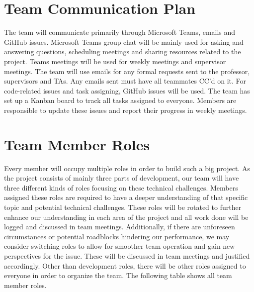 \documentclass{article}
\begin{document}
\section{Team Communication Plan}
\quad The team will communicate primarily through Microsoft Teams,  emails and GitHub issues. Microsoft Teams group chat will be mainly used for asking and answering questions, scheduling meetings and sharing resources related to the project. Teams meetings will be used for weekly meetings and supervisor meetings. 
\quad The team will use emails for any formal requests sent to the professor, supervisors and TAs. Any emails sent must have all teammates CC'd on it.
\quad For code-related issues and task assigning, GitHub issues will be used. The team has set up a Kanban board to track all tasks assigned to everyone. Members are responsible to update these issues and report their progress in weekly meetings.

\section{Team Member Roles}
\quad Every member will occupy multiple roles in order to build such a big project. As the project consists of mainly three parts of development, our team will have three different kinds of roles focusing on these technical challenges. Members assigned these roles are required to have a deeper understanding of that specific topic and potential technical challenges. These roles will be rotated to further enhance our understanding in each area of the project and all work done will be logged and discussed in team meetings. Additionally, if there are unforeseen circumstances or potential roadblocks hindering our performance, we may consider switching roles to allow for smoother team operation and gain new perspectives for the issue. These will be discussed in team meetings and justified accordingly. Other than development roles, there will be other roles assigned to everyone in order to organize the team. The following table shows all team member roles.
\end{document}
